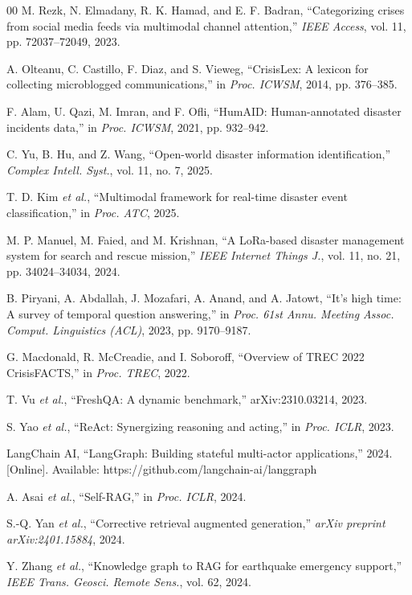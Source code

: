 \documentclass[conference]{IEEEtran}
\begin{document}
\begin{thebibliography}{00}
 M. Rezk, N. Elmadany, R. K. Hamad, and E. F. Badran, ``Categorizing crises from social media feeds via multimodal channel attention,'' \textit{IEEE Access}, vol. 11, pp. 72037--72049, 2023.

 A. Olteanu, C. Castillo, F. Diaz, and S. Vieweg, ``CrisisLex: A lexicon for collecting microblogged communications,'' in \textit{Proc. ICWSM}, 2014, pp. 376--385.

 F. Alam, U. Qazi, M. Imran, and F. Ofli, ``HumAID: Human-annotated disaster incidents data,'' in \textit{Proc. ICWSM}, 2021, pp. 932--942.

 C. Yu, B. Hu, and Z. Wang, ``Open-world disaster information identification,'' \textit{Complex Intell. Syst.}, vol. 11, no. 7, 2025.

 T. D. Kim \textit{et al.}, ``Multimodal framework for real-time disaster event classification,'' in \textit{Proc. ATC}, 2025.


 M. P. Manuel, M. Faied, and M. Krishnan, ``A LoRa-based disaster management system for search and rescue mission,'' \textit{IEEE Internet Things J.}, vol. 11, no. 21, pp. 34024--34034, 2024.

 B. Piryani, A. Abdallah, J. Mozafari, A. Anand, and A. Jatowt, ``It's high time: A survey of temporal question answering,'' in \textit{Proc. 61st Annu. Meeting Assoc. Comput. Linguistics (ACL)}, 2023, pp. 9170--9187.

 G. Macdonald, R. McCreadie, and I. Soboroff, ``Overview of TREC 2022 CrisisFACTS,'' in \textit{Proc. TREC}, 2022.

 T. Vu \textit{et al.}, ``FreshQA: A dynamic benchmark,'' arXiv:2310.03214, 2023.

 S. Yao \textit{et al.}, ``ReAct: Synergizing reasoning and acting,'' in \textit{Proc. ICLR}, 2023.

 LangChain AI, ``LangGraph: Building stateful multi-actor applications,'' 2024. [Online]. Available: https://github.com/langchain-ai/langgraph

 A. Asai \textit{et al.}, ``Self-RAG,'' in \textit{Proc. ICLR}, 2024.

 S.-Q. Yan \textit{et al.}, ``Corrective retrieval augmented generation,'' \textit{arXiv preprint arXiv:2401.15884}, 2024.

 Y. Zhang \textit{et al.}, ``Knowledge graph to RAG for earthquake emergency support,'' \textit{IEEE Trans. Geosci. Remote Sens.}, vol. 62, 2024.


\end{thebibliography}
\end{document}
